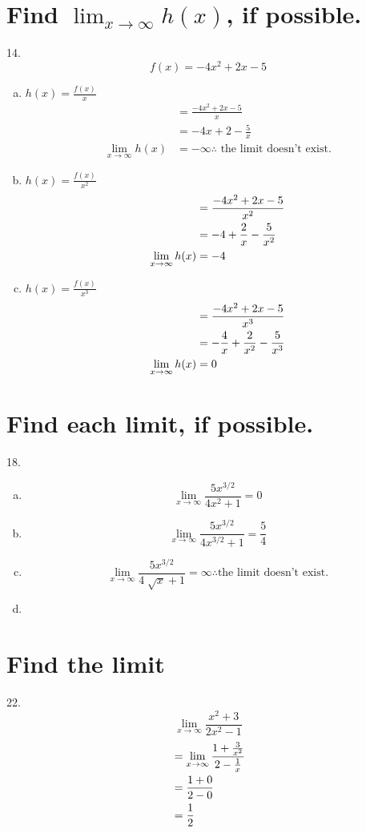 \documentclass[11pt]{article}
\newcommand*{\set}{\setcounter{equation}{0}}
\begin{document}
\section{Find $\lim_{x\to\infty}h(x)$, if possible.}
14.\[f(x)=-4x^2+2x-5\]
\begin{enumerate}[(a)]
    \item $h(x)=\frac{f(x)}{x}$
        \begin{align}
            &=\frac{-4x^2+2x-5}{x}\\
            &=-4x+2-\frac{5}{x}\\
            \lim_{x\to\infty}h(x)&=-\infty\therefore\,\,\text{the limit doesn't exist.}
        \end{align}
    \item $h(x)=\frac{f(x)}{x^2}$
        \begin{align}
            \set
            &=\frac{-4x^2+2x-5}{x^2}\\
            &=-4+\frac{2}{x}-\frac{5}{x^2}\\
            \lim_{x\to\infty}h(x)&=-4
        \end{align}
    \item $h(x)=\frac{f(x)}{x^3}$
        \begin{align}
            \set
            &=\frac{-4x^2+2x-5}{x^3}\\
            &=-\frac{4}{x}+\frac{2}{x^2}-\frac{5}{x^3}\\
            \lim_{x\to\infty}h(x)&=0
        \end{align}
\end{enumerate}

\section{Find each limit, if possible.}
18.\begin{enumerate}[(a)]
    \item \[\lim_{x\to\infty}\frac{5x^{3/2}}{4x^2+1}=0\]
    \item \[\lim_{x\to\infty}\frac{5x^{3/2}}{4x^{3/2}+1}=\frac{5}{4}\]
    \item \[\lim_{x\to\infty}\frac{5x^{3/2}}{4\sqrt[]{x}+1}=\infty\therefore\text{the limit doesn't exist.}\]
    \item 
\end{enumerate}

\section{Find the limit}
22.\[\lim_{x\to\infty}\frac{x^2+3}{2x^2-1}\]
\begin{align}
    \set
    &=\lim_{x\to\infty}\frac{1+\frac{3}{x^2}}{2-\frac{1}{x}}\\
    &=\frac{1+0}{2-0}\\
    &=\frac{1}{2}
\end{align}
\end{document}
